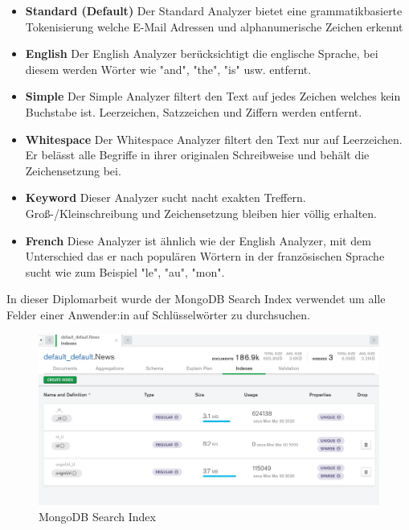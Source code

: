 \begin{itemize}
    \item \textbf{Standard (Default)}
        \newline
        Der Standard Analyzer bietet eine grammatikbasierte Tokenisierung welche E-Mail Adressen und alphanumerische Zeichen erkennt
    \item \textbf{English}
        \newline
        Der English Analyzer berücksichtigt die englische Sprache, bei diesem werden Wörter wie "and", "the", "is" usw. entfernt.
    \item \textbf{Simple}
        \newline
        Der Simple Analyzer filtert den Text auf jedes Zeichen welches kein Buchstabe ist. Leerzeichen, Satzzeichen und Ziffern werden entfernt.
    \item \textbf{Whitespace}
        \newline
        Der Whitespace Analyzer filtert den Text nur auf Leerzeichen. Er belässt alle Begriffe in ihrer originalen Schreibweise und behält die Zeichensetzung bei.
    \item \textbf{Keyword}
        \newline
        Dieser Analyzer sucht nacht exakten Treffern. Groß-/Kleinschreibung und Zeichensetzung bleiben hier völlig erhalten.
    \item \textbf{French}
        \newline
        Diese Analyzer ist ähnlich wie der English Analyzer, mit dem Unterschied das er nach populären Wörtern in der französischen Sprache sucht wie zum Beispiel "le", "au", "mon".
\end{itemize}





In dieser Diplomarbeit wurde der MongoDB Search Index verwendet um alle Felder einer Anwender:in auf Schlüsselwörter zu durchsuchen.

\begin{figure}[h!]
    \centering
    \includegraphics[width=1\linewidth]{pics/mongodb-search-indizes.png}
    \caption{MongoDB Search Index}
    \label{fig:enter-label}
\end{figure}


\cite{Search_Indexes}
\cite{Atlas_Indexes}


